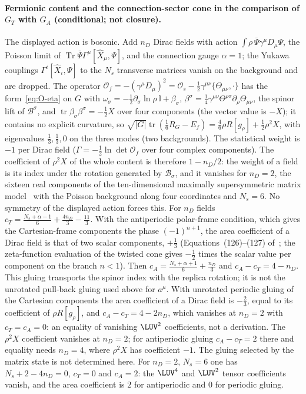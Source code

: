 \paragraph{Fermionic content and the connection-sector cone in the comparison of \(G_T\) with \(G_A\) (conditional; not closure).}
The displayed action is bosonic. Add \(n_D\) Dirac fields with action \(\int\rho\,\bar\Psi\gamma^\mu D_\mu\Psi\), the Poisson limit of \(\operatorname{Tr}\bar\Psi\Gamma^\mu[\hat X_\mu,\Psi]\), and the connection gauge \(\alpha=1\); the Yukawa couplings \(\Gamma^i[\hat X_i,\Psi]\) to the \(N_s\) transverse matrices vanish on the background and are dropped. The operator \(\mathcal O_f=-(\gamma^\mu D_\mu)^2=\mathcal O_s-\tfrac12\gamma^{\mu\nu}\{\Theta_{\mu\nu},\cdot\}\) has the form~\eqref{eq:O-eta} on \(G\) with \(\omega_\sigma=-\tfrac12\partial_\sigma\ln\rho\,\mathbb I+\beta_\sigma\), \(\beta^\sigma=\tfrac14\gamma^{\mu\nu}\Theta^{\rho\sigma}\partial_\rho\Theta_{\mu\nu}\), the spinor lift of \(\mathcal B^\sigma\), and \(\operatorname{tr}\beta_\sigma\beta^\sigma=-\tfrac12X\) over four components (the vector value is \(-X\)); it contains no explicit curvature, so \(\sqrt{|G|}\operatorname{tr}(\tfrac16R_G-E_f)=\tfrac46\rho R[g_\rho]+\tfrac12\rho^2X\), with eigenvalues \(\tfrac13,\tfrac13,0\) on the three modes (two backgrounds). The statistical weight is \(-1\) per Dirac field (\(\Gamma=-\tfrac12\ln\det\mathcal O_f\) over four complex components). The coefficient of \(\rho^2X\) of the whole content is therefore \(1-n_D/2\): the weight of a field is its index under the rotation generated by \(\mathcal B_\sigma\), and it vanishes for \(n_D=2\), the sixteen real components of the ten-dimensional maximally supersymmetric matrix model~\cite{IKKT1997} with the Poisson background along four coordinates and \(N_s=6\). No symmetry of the displayed action forces this. For \(n_D\) fields \(c_T=\tfrac{N_s+\alpha-1}6+\tfrac{4n_D}3-\tfrac{11}3\). With the antiperiodic polar-frame condition, which gives the Cartesian-frame components the phase \((-1)^{n+1}\), the area coefficient of a Dirac field is that of two scalar components, \(+\tfrac13\) (Equations~(126)--(127) of~\cite{Solodukhin2011}; the zeta-function evaluation of the twisted cone gives \(-\tfrac12\) times the scalar value per component on the branch \(n<1\)). Then \(c_A=\tfrac{N_s+\alpha+1}6+\tfrac{n_D}3\) and \(c_A-c_T=4-n_D\). This gluing transports the spinor index with the replica rotation; it is not the unrotated pull-back gluing used above for \(a^\mu\). With unrotated periodic gluing of the Cartesian components the area coefficient of a Dirac field is \(-\tfrac23\), equal to its coefficient of \(\rho R[g_\rho]\), and \(c_A-c_T=4-2n_D\), which vanishes at \(n_D=2\) with \(c_T=c_A=0\): an equality of vanishing \(\LUV^2\) coefficients, not a derivation. The \(\rho^2X\) coefficient vanishes at \(n_D=2\); for antiperiodic gluing \(c_A-c_T=2\) there and equality needs \(n_D=4\), where \(\rho^2X\) has coefficient \(-1\). The gluing selected by the matrix state is not determined here. For \(n_D=2\), \(N_s=6\) one has \(N_s+2-4n_D=0\), \(c_T=0\) and \(c_A=2\): the \(\LUV^4\) and \(\LUV^2\) tensor coefficients vanish, and the area coefficient is \(2\) for antiperiodic and \(0\) for periodic gluing.

